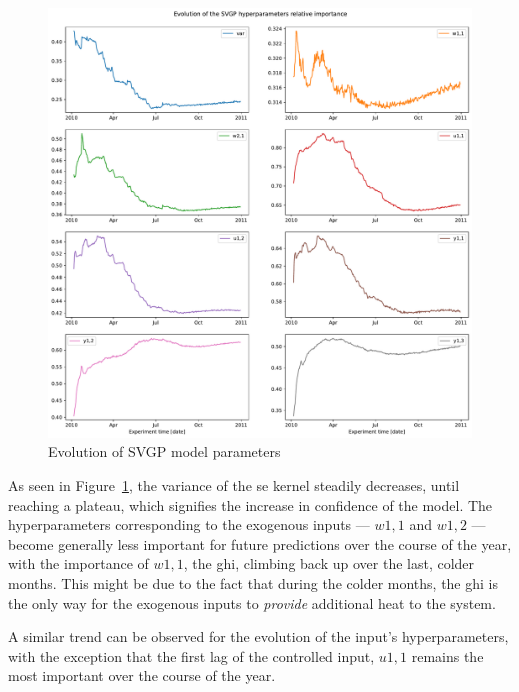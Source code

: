 
\begin{figure}[ht]
    \centering
    \includegraphics[width =
    \textwidth]{Plots/1_SVGP_480pts_inf_window_12_averageYear_evol_importance.pdf}
    \caption{Evolution of SVGP model parameters}
    \label{fig:SVGP_evol_importance}
\end{figure}

As seen in Figure~\ref{fig:SVGP_evol_importance}, the variance of the
\acrshort{se} kernel steadily decreases, until reaching a plateau, which
signifies the increase in confidence of the model. The hyperparameters
corresponding to the exogenous inputs --- $w1,1$ and $w1,2$ --- become generally
less important for future predictions over the course of the year, with the
importance of $w1,1$, the \acrlong{ghi}, climbing back up over the last, colder
months. This might be due to the fact that during the colder months, the
\acrshort{ghi} is the only way for the exogenous inputs to \textit{provide}
additional heat to the system.

A similar trend can be observed for the evolution of the input's
hyperparameters, with the exception that the first lag of the controlled input,
$u1,1$ remains the most important over the course of the year.

